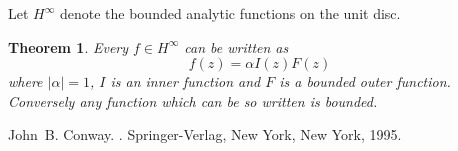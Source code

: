 \documentclass[12pt]{article}
\theoremstyle{theorem}
\newtheorem*{thm}{Theorem}
\theoremstyle{definition}
\theoremstyle{remark}
\begin{document}
Let $H^\infty$ denote the bounded analytic functions on the unit disc.

\begin{thm}
Every $f \in H^\infty$ can be written as
\begin{equation*}
f(z) = \alpha I(z) F(z)
\end{equation*}
where $\lvert \alpha \rvert = 1$, $I$ is an inner function and $F$ is a bounded outer function.  Conversely any function which can be so written is bounded.
\end{thm}

\begin{thebibliography}{9}
John~B. Conway.
{\em {}}.
Springer-Verlag, New York, New York, 1995.
\end{thebibliography}
\end{document}
